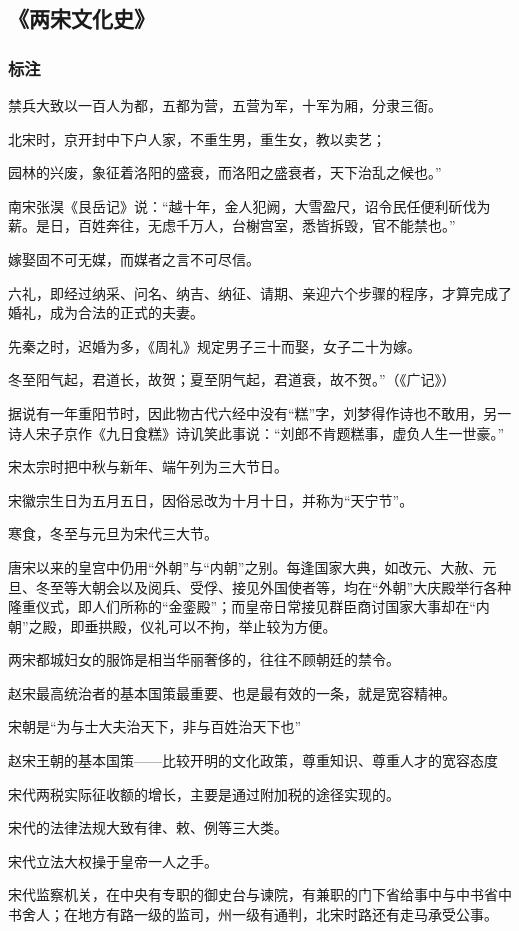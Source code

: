 \subsection{《两宋文化史》}
\subsubsection{标注}
禁兵大致以一百人为都，五都为营，五营为军，十军为厢，分隶三衙。

北宋时，京开封中下户人家，不重生男，重生女，教以卖艺；

园林的兴废，象征着洛阳的盛衰，而洛阳之盛衰者，天下治乱之候也。”

南宋张淏《艮岳记》说：“越十年，金人犯阙，大雪盈尺，诏令民任便利斫伐为薪。是日，百姓奔往，无虑千万人，台榭宫室，悉皆拆毁，官不能禁也。”

嫁娶固不可无媒，而媒者之言不可尽信。

六礼，即经过纳采、问名、纳吉、纳征、请期、亲迎六个步骤的程序，才算完成了婚礼，成为合法的正式的夫妻。

先秦之时，迟婚为多，《周礼》规定男子三十而娶，女子二十为嫁。

冬至阳气起，君道长，故贺；夏至阴气起，君道衰，故不贺。”（《广记》）

据说有一年重阳节时，因此物古代六经中没有“糕”字，刘梦得作诗也不敢用，另一诗人宋子京作《九日食糕》诗讥笑此事说：“刘郎不肯题糕事，虚负人生一世豪。”

宋太宗时把中秋与新年、端午列为三大节日。

宋徽宗生日为五月五日，因俗忌改为十月十日，并称为“天宁节”。

寒食，冬至与元旦为宋代三大节。

唐宋以来的皇宫中仍用“外朝”与“内朝”之别。每逢国家大典，如改元、大赦、元旦、冬至等大朝会以及阅兵、受俘、接见外国使者等，均在“外朝”大庆殿举行各种隆重仪式，即人们所称的“金銮殿”；而皇帝日常接见群臣商讨国家大事却在“内朝”之殿，即垂拱殿，仪礼可以不拘，举止较为方便。

两宋都城妇女的服饰是相当华丽奢侈的，往往不顾朝廷的禁令。

赵宋最高统治者的基本国策最重要、也是最有效的一条，就是宽容精神。

宋朝是“为与士大夫治天下，非与百姓治天下也”

赵宋王朝的基本国策——比较开明的文化政策，尊重知识、尊重人才的宽容态度

宋代两税实际征收额的增长，主要是通过附加税的途径实现的。

宋代的法律法规大致有律、敕、例等三大类。

宋代立法大权操于皇帝一人之手。

宋代监察机关，在中央有专职的御史台与谏院，有兼职的门下省给事中与中书省中书舍人；在地方有路一级的监司，州一级有通判，北宋时路还有走马承受公事。